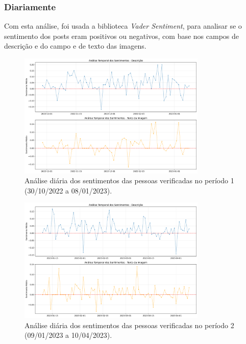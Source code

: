 \documentclass[manuscript,screen,review]{acmart}
\begin{document}
\subsubsection{Diariamente}

Com esta análise, foi usada a biblioteca \textit{Vader Sentiment}, para analisar se o sentimento dos posts eram positivos ou negativos, com base nos campos de descrição e do campo e de texto das imagens.

\begin{figure}[h]
\centering
\includegraphics[width=0.8\textwidth]{figura1_sentimentos_verificadas_periodo1.png}
\caption{Análise diária dos sentimentos das pessoas verificadas no período 1 (30/10/2022 a 08/01/2023).}
\label{fig:figura1}
\end{figure}

\begin{figure}[h]
\centering
\includegraphics[width=0.8\textwidth]{figura2_sentimentos_verificadas_periodo2.png}
\caption{Análise diária dos sentimentos das pessoas verificadas no período 2 (09/01/2023 a 10/04/2023).}
\label{fig:figura2}
\end{figure}
\end{document}
